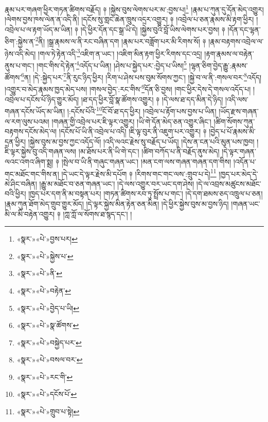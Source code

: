 རྣམ་པར་གཞག་ཕྱིར་གཏན་ཚིགས་བརྗོད། ༈ །སྐྱེས་བུས་ལེགས་པར་མ་:བྱས་པ།\footnote{«སྣར་»«པེ་»བྱས་པར།} །རྣམ་པ་ཀུན་དུ་དོན་མེད་འགྱུར། །ལེགས་བྱས་ཁས་ལེན་ན་འདི་ནི། །དངོས་སུ་གླང་ཆེན་ཁྲུས་འདྲར་འགྱུར། ༈ །འབྲེལ་པ་ཅན་རྣམས་མི་རྟག་ཕྱིར། །འབྲེལ་པ་ལ་རྟག་ཡོད་མ་ཡིན། ༈ །དེ་ཕྱིར་དོན་དང་སྒྲ་ཡི་དེ། །སྐྱེས་བུའི་བློ་ཡིས་ལེགས་པར་བྱས། ༈ །དོན་དང་ལྷན་ཅིག་:སྐྱེས་ན་\footnote{«སྣར་»«པེ་»སྐྱེས་པ་}ནི། །སྒྲ་རྣམས་ལ་ནི་རང་བཞིན་དག །རྣམ་པར་བཟློག་པར་མི་རིགས་སོ། ༈ །རྣམ་བརྟགས་འབྲེལ་ལ་ཉེས་འདི་མེད། །གལ་ཏེ་རྟེན་འདི་\footnote{«སྣར་»«པེ་»ནི་}འཇིག་ན་ཡང་། །འཇིག་མིན་རྟག་ཕྱིར་རིགས་དང་འདྲ། །རྟག་རྣམས་ལ་བརྟེན་ནུས་པ་གང་། །གང་གིས་དེ་རྟེན་\footnote{«སྣར་»«པེ་»བརྟེན་}འདོད་པ་ཡིན། །ཤེས་པ་སྐྱེད་པར་:བྱེད་པ་ཡིས།\footnote{«སྣར་»«པེ་»བྱེད་པ་ཡི།} །ལྷན་ཅིག་བྱེད་རྒྱུ་:རྣམས་ཚོགས་\footnote{«སྣར་»«པེ་»སྣ་ཚོགས་}ན། །དེ་:སྐྱེད་པར་\footnote{«སྣར་»«པེ་»བསྐྱེད་པར་}ནི་རུང་ཉིད་ཕྱིར། །རིག་པ་ཤེས་པས་བུམ་སོགས་ཀྱང་། །སྐྱེ་བ་ལ་ནི་:གསལ་བར་\footnote{«སྣར་»«པེ་»བསལ་བར་}འདོད། །འགྱུར་བ་མེད་རྣམས་ཁྱད་མེད་པས། །གསལ་བྱེད་:རང་གིས་\footnote{«སྣར་»«པེ་»རང་གི་}དོན་ཅི་བྱས། །གང་ཕྱིར་དེས་དེ་གསལ་འདོད་པ། །འབྲེལ་པ་དངོས་པོ་ཉིད་གྱུར་མོད། །ཐ་དད་ཕྱིར་བློ་སྣ་ཚོགས་འགྱུར། ༈ །དེ་ལས་ཐ་དད་མིན་དེ་ཉིད། །འདི་ལས་གཞན་དངོས་ཡོད་མ་ཡིན། །:དངོས་པོའི་\footnote{«སྣར་»«པེ་»དངོས་པོ་}ངོ་བོ་ཐ་དད་ཕྱིར། །འབྲེལ་པ་རྟོག་པས་བྱས་པ་ཡིན། །ཡོད་རྫས་གཞན་ལ་རག་ལུས་པའམ། །གཞན་གྱི་འབྲེལ་པར་ཇི་ལྟར་འགྱུར། །ཡི་གེ་དོན་མེད་ཅན་འགྱུར་ཞིང་། །ཚིག་སོགས་ཀུན་བརྟགས་དངོས་མེད་ལ། །དངོས་པོ་ཡི་ནི་འབྲེལ་པ་འདི། །ཇི་ལྟ་བུར་ནི་འཇུག་པར་འགྱུར། ༈ །བྱེད་པ་པོ་རྣམས་མི་དྲན་ཕྱིར། །སྐྱེས་བུས་མ་བྱས་ཀྱང་འདོད་ལོ། །འདི་ལའང་རྗེས་སུ་བརྗོད་པ་ཡོད། །དེས་ན་ངན་པའི་མུན་པས་ཁྱབ། །ཇི་ལྟར་སྐྱེས་བུ་འདི་གཞན་ལས། །མ་ཐོས་པར་ནི་ཡི་གེ་དང་། །ཚིག་བཀོད་པ་ནི་བརྗོད་ནུས་མེད། །དེ་ལྟར་གཞན་ལའང་འགའ་ཞིག་སྨྲ། ༈ །སྤེལ་བ་ཡི་ནི་གཞུང་གཞན་ཡང་། །མན་ངག་ལས་གཞན་གཞན་དག་གིས། །འདོན་པ་གང་མཐོང་གང་གིས་ན། །དེ་ཡང་དེ་ལྟར་རྗེས་མི་དཔོག ༈ །རིགས་གང་གང་ལས་:གྲུབ་པ་དེ།\footnote{«སྣར་»«པེ་»གྲུབ་པ་སྟེ།} །ཁྱད་པར་མེད་དེ་མེ་ཤིང་བཞིན། །རྒྱུ་མ་མཐོང་བ་ཅན་གཞན་ཡང་། །དེ་ལས་འགྱུར་བར་ཡང་དག་ཤེས། །དེ་ལ་འབྲས་མཚུངས་མཐོང་བའི་ཕྱིར། །ཁྱད་པར་དག་ནི་མ་བསྟན་པར། །གཏན་ཚིགས་རབ་ཏུ་སྤྲོས་པ་གང་། །དེ་དག་ཐམས་ཅད་འཁྲུལ་པ་ཅན། །རྣམ་ཀུན་ཐོག་མེད་གྲུབ་གྱུར་མོད། །དེ་ལྟར་སྐྱེས་མིན་རྟེན་ཅན་མིན། །དེ་ཕྱིར་སྐྱེས་བུས་མ་བྱས་ཉིད། །གཞན་ཡང་མི་ལ་མི་བརྟེན་འགྱུར། ༈ །ཀླ་ཀློ་ལ་སོགས་ཐ་སྙད་དང་། །
